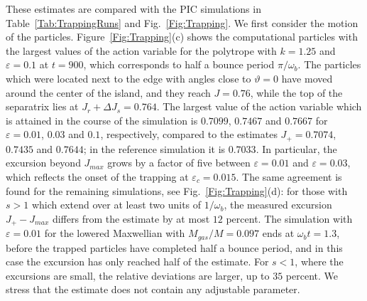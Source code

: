These estimates are compared with the PIC simulations in Table~\ref{Tab:TrappingRuns} and Fig.~\ref{Fig:Trapping}. We first consider the motion of the particles. Figure~\ref{Fig:Trapping}(c) shows the computational particles with the largest values of the action variable for the polytrope with $k = 1.25$ and $\varepsilon = 0.1$ at $t = 900$, which corresponds to half a bounce period $\pi/\omega_b$. The particles which were located next to the edge with angles close to $\vartheta = 0$ have moved around the center of the island, and they reach $J = 0.76$, while the top of the separatrix lies at $J_r + \Delta J_s = 0.764$. The largest value of the action variable which is attained in the course of the simulation is $0.7099$, $0.7467$ and $0.7667$ for $\varepsilon = 0.01$, $0.03$ and $0.1$, respectively, compared to the estimates $J_+ = 0.7074$, $0.7435$ and $0.7644$; in the reference simulation it is $0.7033$. In particular, the excursion beyond $J_{max}$ grows by a factor of five between $\varepsilon = 0.01$ and $\varepsilon = 0.03$, which reflects the onset of the trapping at $\varepsilon_c = 0.015$. The same agreement is found for the remaining simulations, see Fig.~\ref{Fig:Trapping}(d): for those with $s > 1$ which extend over at least two units of $1/\omega_b$, the measured excursion $J_+ - J_{max}$ differs from the estimate by at most $12$ percent. The simulation with $\varepsilon = 0.01$ for the lowered Maxwellian with $M_{gas}/M = 0.097$ ends at $\omega_b t = 1.3$, before the trapped particles have completed half a bounce period, and in this case the excursion has only reached half of the estimate. For $s < 1$, where the excursions are small, the relative deviations are larger, up to $35$ percent. We stress that the estimate does not contain any adjustable parameter.

